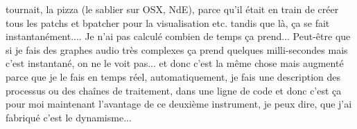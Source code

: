 tournait, la pizza (le sablier sur OSX, NdE), parce qu'il était en train de créer tous les patchs et bpatcher pour la visualisation etc. tandis que là, ça se fait instantanément.... Je n'ai pas calculé combien de temps ça prend... Peut-être que si je fais des graphes audio très complexes ça prend quelques milli-secondes mais c'est instantané, on ne le voit pas... et donc c'est la même chose mais augmenté parce que je le fais en temps réel, automatiquement, je fais une description des processus ou des chaînes de traitement, dans une ligne de code et donc c'est ça pour moi maintenant l'avantage de ce deuxième instrument, je peux dire, que j'ai fabriqué c'est le dynamisme...  






